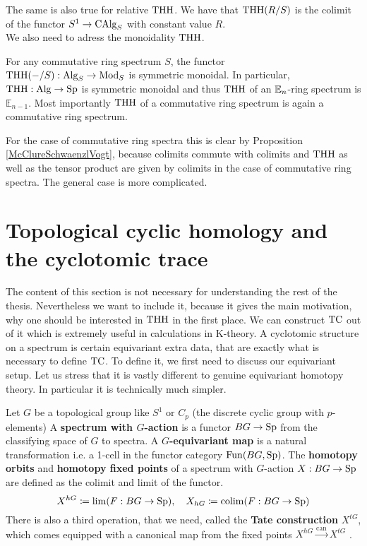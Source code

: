 The same is also true for relative $\operatorname{THH}$. We have that $\operatorname{THH}(R/S)$ is the colimit of the functor $S^1\rightarrow \operatorname{CAlg}_S$ with constant value $R$.
\\
We also need to adress the monoidality $\operatorname{THH}$.
\begin{prop}
    For any commutative ring spectrum $S$, the functor \\ $\operatorname{THH}(-/S): \operatorname{Alg}_S\rightarrow \operatorname{Mod}_S$ is symmetric monoidal. In particular, $\operatorname{THH}:\operatorname{Alg}\to \operatorname{Sp}$ is symmetric monoidal and thus $\operatorname{THH}$ of an $\mathbb{E}_n$-ring spectrum is $\mathbb{E}_{n-1}$. Most importantly $\operatorname{THH}$ of a commutative ring spectrum is again a commutative ring spectrum.
\end{prop}
For the case of commutative ring spectra this is clear by Proposition \ref{McClureSchwaenzlVogt}, because colimits commute with colimits and $\operatorname{THH}$ as well as the tensor product are given by colimits in the case of commutative ring spectra. The general case is more complicated.

\section{Topological cyclic homology and the cyclotomic trace} \label{TC}
The content of this section is not necessary for understanding the rest of the thesis. Nevertheless we want to include it, because it gives the main motivation, why one should be interested in $\operatorname{THH}$ in the first place. We can construct $\operatorname{TC}$ out of it which is extremely useful in calculations in K-theory.
A cyclotomic structure on a spectrum is certain equivariant extra data, that are exactly what is necessary to define $\operatorname{TC}$.
To define it, we first need to discuss our equivariant setup. Let us stress that it is vastly different to genuine equivariant homotopy theory. In particular it is technically much simpler.
\begin{defn}
    Let $G$ be a topological group like $S^1$ or $C_p$ (the discrete cyclic group with $p$-elements) 
    A \textbf{spectrum with $G$-action} is a functor $BG\to \operatorname{Sp}$ from the classifying space of $G$ to spectra. A \textbf{$G$-equivariant map} is a natural transformation i.e. a 1-cell in the functor category $\operatorname{Fun}(BG,\operatorname{Sp})$. The \textbf{homotopy orbits} and \textbf{homotopy fixed points} of a spectrum with $G$-action $X:BG\to \operatorname{Sp}$ are defined as the colimit and limit of the functor.
    \begin{equation*}
        X^{hG}\coloneqq \lim(F:BG\to \operatorname{Sp}),\quad X_{hG}\coloneqq \operatorname{colim}(F:BG\to \operatorname{Sp})
    \end{equation*}
    There is also a third operation, that we need, called the \textbf{Tate construction} $X^{tG}$, which comes equipped with a canonical map from the fixed points $X^{hG}\xrightarrow{\mathrm{can}}X^{tG}$ . 
\end{defn}

